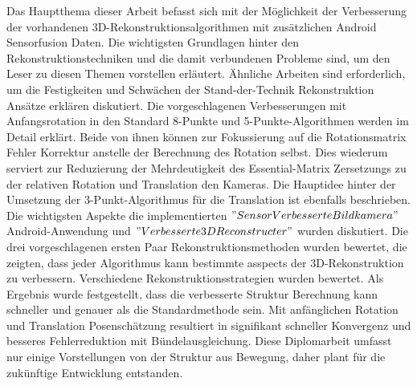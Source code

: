 \begin{abstracts}        %

Das Hauptthema dieser Arbeit befasst sich mit der M{\"o}glichkeit der Verbesserung der vorhandenen 3D-Rekonstruktionsalgorithmen mit zus{\"a}tzlichen Android Sensorfusion Daten. Die wichtigsten Grundlagen hinter den Rekonstruktionstechniken und die damit verbundenen Probleme sind, um den Leser zu diesen Themen vorstellen erl{\"a}utert. {\"A}hnliche Arbeiten sind erforderlich, um die Festigkeiten und Schw{\"a}chen der Stand-der-Technik Rekonstruktion Ansätze erkl{\"a}ren diskutiert. Die vorgeschlagenen Verbesserungen mit Anfangsrotation in den Standard 8-Punkte und 5-Punkte-Algorithmen werden im Detail erkl{\"a}rt. Beide von ihnen k{\"o}nnen zur Fokussierung auf die Rotationsmatrix Fehler Korrektur anstelle der Berechnung des Rotation selbst. Dies wiederum serviert zur Reduzierung der Mehrdeutigkeit des Essential-Matrix Zersetzungs zu der relativen Rotation und Translation den Kameras. Die Hauptidee hinter der Umsetzung der 3-Punkt-Algorithmus f{\"u}r die Translation ist ebenfalls beschrieben. Die wichtigsten Aspekte die implementierten $"Sensor Verbesserte Bildkamera "$ Android-Anwendung und $ "Verbesserte 3D Reconstructer "$  wurden diskutiert.
Die drei vorgeschlagenen ersten Paar Rekonstruktionsmethoden wurden bewertet, die zeigten, dass jeder Algorithmus kann bestimmte asspects der 3D-Rekonstruktion zu verbessern. Verschiedene Rekonstruktionsstrategien wurden bewertet. Als Ergebnis wurde festgestellt, dass die verbesserte Struktur Berechnung kann schneller und genauer als die Standardmethode sein. Mit  anfänglichen Rotation und Translation  Posenschätzung resultiert in signifikant schneller Konvergenz und besseres Fehlerreduktion mit B{\"u}ndelausgleichung. Diese Diplomarbeit umfasst nur einige Vorstellungen von der Struktur aus Bewegung, daher plant f{\"u}r die zuk{\"u}nftige Entwicklung entstanden.

\end{abstracts}


